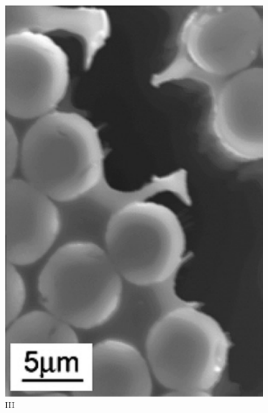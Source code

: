 \begin{subfigure}{0.32\linewidth}
  \setlength{\figwidth}{\linewidth}
  \centering
  \includegraphics[width=\figwidth,height=\figheight,keepaspectratio]{Exp_RVE_HobbiebrunkenT_woArrow_III}
  \caption{III}%
  \label{fig:Exp:RVE:HobbiebrunkenT:III}
\end{subfigure}%